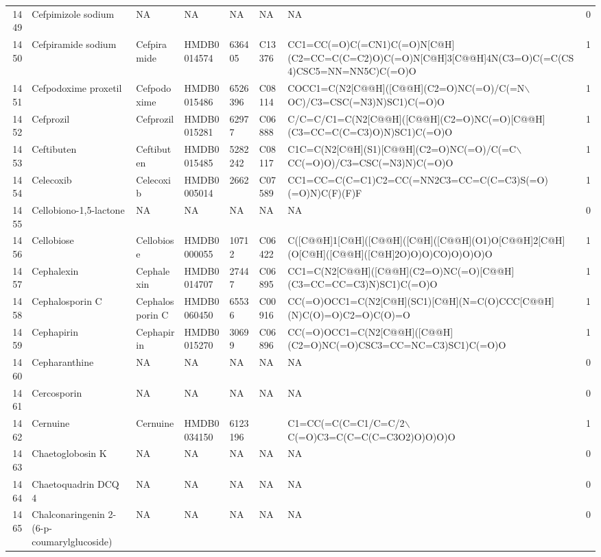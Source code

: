 \documentclass[a4paper]{article}
\begin{document}
\begin{longtable}{rlllllll}
  1449 & Cefpimizole sodium & NA & NA & NA & NA & NA & 0 \\ 
  1450 & Cefpiramide sodium & Cefpiramide & HMDB0014574 & 636405 & C13376 & CC1=CC(=O)C(=CN1)C(=O)N[C@H](C2=CC=C(C=C2)O)C(=O)N[C@H]3[C@@H]4N(C3=O)C(=C(CS4)CSC5=NN=NN5C)C(=O)O & 1 \\ 
  1451 & Cefpodoxime proxetil & Cefpodoxime & HMDB0015486 & 6526396 & C08114 & COCC1=C(N2[C@@H]([C@@H](C2=O)NC(=O)/C(=N$\backslash$OC)/C3=CSC(=N3)N)SC1)C(=O)O & 1 \\ 
  1452 & Cefprozil & Cefprozil & HMDB0015281 & 62977 & C06888 & C/C=C/C1=C(N2[C@@H]([C@@H](C2=O)NC(=O)[C@@H](C3=CC=C(C=C3)O)N)SC1)C(=O)O & 1 \\ 
  1453 & Ceftibuten & Ceftibuten & HMDB0015485 & 5282242 & C08117 & C1C=C(N2[C@H](S1)[C@@H](C2=O)NC(=O)/C(=C$\backslash$CC(=O)O)/C3=CSC(=N3)N)C(=O)O & 1 \\ 
  1454 & Celecoxib & Celecoxib & HMDB0005014 & 2662 & C07589 & CC1=CC=C(C=C1)C2=CC(=NN2C3=CC=C(C=C3)S(=O)(=O)N)C(F)(F)F & 1 \\ 
  1455 & Cellobiono-1,5-lactone & NA & NA & NA & NA & NA & 0 \\ 
  1456 & Cellobiose & Cellobiose & HMDB0000055 & 10712 & C06422 & C([C@@H]1[C@H]([C@@H]([C@H]([C@@H](O1)O[C@@H]2[C@H](O[C@H]([C@@H]([C@H]2O)O)O)CO)O)O)O)O & 1 \\ 
  1457 & Cephalexin & Cephalexin & HMDB0014707 & 27447 & C06895 & CC1=C(N2[C@@H]([C@@H](C2=O)NC(=O)[C@@H](C3=CC=CC=C3)N)SC1)C(=O)O & 1 \\ 
  1458 & Cephalosporin C & Cephalosporin C & HMDB0060450 & 65536 & C00916 & CC(=O)OCC1=C(N2[C@H](SC1)[C@H](N=C(O)CCC[C@@H](N)C(O)=O)C2=O)C(O)=O & 1 \\ 
  1459 & Cephapirin & Cephapirin & HMDB0015270 & 30699 & C06896 & CC(=O)OCC1=C(N2[C@@H]([C@@H](C2=O)NC(=O)CSC3=CC=NC=C3)SC1)C(=O)O & 1 \\ 
  1460 & Cepharanthine & NA & NA & NA & NA & NA & 0 \\ 
  1461 & Cercosporin & NA & NA & NA & NA & NA & 0 \\ 
  1462 & Cernuine & Cernuine & HMDB0034150 & 6123196 &  & C1=CC(=C(C=C1/C=C/2$\backslash$C(=O)C3=C(C=C(C=C3O2)O)O)O)O & 1 \\ 
  1463 & Chaetoglobosin K & NA & NA & NA & NA & NA & 0 \\ 
  1464 & Chaetoquadrin DCQ 4 & NA & NA & NA & NA & NA & 0 \\ 
  1465 & Chalconaringenin 2-(6-p-coumarylglucoside) & NA & NA & NA & NA & NA & 0 \\ 

\end{longtable}
\end{document}
